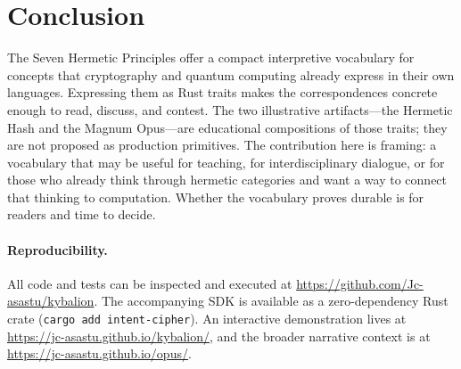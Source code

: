 \documentclass[sigplan,anonymous=false]{acmart}
\begin{document}
\section{Conclusion}

The Seven Hermetic Principles offer a compact interpretive vocabulary for concepts that cryptography and quantum computing already express in their own languages. Expressing them as Rust traits makes the correspondences concrete enough to read, discuss, and contest. The two illustrative artifacts---the Hermetic Hash and the Magnum Opus---are educational compositions of those traits; they are not proposed as production primitives. The contribution here is framing: a vocabulary that may be useful for teaching, for interdisciplinary dialogue, or for those who already think through hermetic categories and want a way to connect that thinking to computation. Whether the vocabulary proves durable is for readers and time to decide.

\paragraph{Reproducibility.} All code and tests can be inspected and executed at \url{https://github.com/Jc-asastu/kybalion}. The accompanying SDK is available as a zero-dependency Rust crate (\texttt{cargo add intent-cipher}). An interactive demonstration lives at \url{https://jc-asastu.github.io/kybalion/}, and the broader narrative context is at \url{https://jc-asastu.github.io/opus/}.
\end{document}
